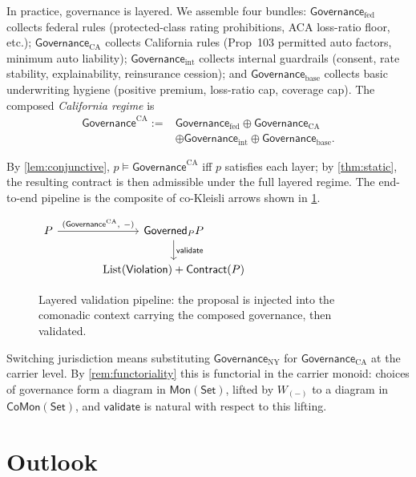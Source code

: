 \documentclass[journal,10pt]{IEEEtran}
\theoremstyle{plain}
\theoremstyle{definition}
\theoremstyle{remark}
\newcommand{\Set}{\mathsf{Set}}
\newcommand{\Mon}{\mathsf{Mon}}
\newcommand{\CoMon}{\mathsf{CoMon}}
\newcommand{\Governed}{\mathsf{Governed}}
\newcommand{\Governance}{\mathsf{Governance}}
\newcommand{\Contract}{\mathsf{Contract}}
\newcommand{\Violation}{\mathsf{Violation}}
\newcommand{\Validate}{\mathsf{validate}}
\begin{document}
In practice, governance is layered. We assemble four bundles:
$\Governance_{\mathrm{fed}}$ collects federal rules (protected-class
rating prohibitions, ACA loss-ratio floor, etc.);
$\Governance_{\mathrm{CA}}$ collects California rules (Prop~103
permitted auto factors, minimum auto liability);
$\Governance_{\mathrm{int}}$ collects internal guardrails (consent,
rate stability, explainability, reinsurance cession); and
$\Governance_{\mathrm{base}}$ collects basic underwriting hygiene
(positive premium, loss-ratio cap, coverage cap). The composed
\emph{California regime} is
\begin{equation*}
\begin{aligned}
\Governance^{\mathrm{CA}} := {}
  & \Governance_{\mathrm{fed}}
        \oplus \Governance_{\mathrm{CA}} \\
  & \oplus \Governance_{\mathrm{int}}
        \oplus \Governance_{\mathrm{base}}.
\end{aligned}
\end{equation*}

By \cref{lem:conjunctive},
$p \models \Governance^{\mathrm{CA}}$ iff $p$ satisfies
each layer; by \cref{thm:static}, the resulting contract is then
admissible under the full layered regime. The end-to-end pipeline is
the composite of co-Kleisli arrows shown in
\cref{fig:layered-pipeline}.

\begin{figure}[!t]
\centering
$\begin{tikzcd}[column sep=large, row sep=normal, ampersand replacement=\&]
P
  \arrow[r, "{(\Governance^{\mathrm{CA}},\ -)}"]
\& \Governed_P P
  \arrow[d, "\Validate"]
\\
\& \mathrm{List}(\Violation) + \Contract(P)
\end{tikzcd}$
\caption{Layered validation pipeline: the proposal is injected into
the comonadic context carrying the composed governance, then validated.}
\label{fig:layered-pipeline}
\end{figure}

Switching jurisdiction means substituting
$\Governance_{\mathrm{NY}}$ for $\Governance_{\mathrm{CA}}$ at the
carrier level. By \cref{rem:functoriality} this is functorial in the
carrier monoid: choices of governance form a diagram in
$\Mon(\Set)$, lifted by $W_{(-)}$ to a diagram in $\CoMon(\Set)$, and
$\Validate$ is natural with respect to this lifting.

\section{Outlook}
\label{sec:outlook}
\end{document}
